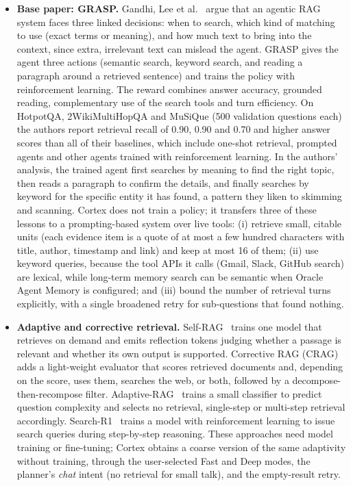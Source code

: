 \begin{itemize}
\item \textbf{Base paper: GRASP.} Gandhi, Lee et al.~\cite{grasp2026} argue that an agentic RAG system faces three linked decisions: when to search, which kind of matching to use (exact terms or meaning), and how much text to bring into the context, since extra, irrelevant text can mislead the agent. GRASP gives the agent three actions (semantic search, keyword search, and reading a paragraph around a retrieved sentence) and trains the policy with reinforcement learning. The reward combines answer accuracy, grounded reading, complementary use of the search tools and turn efficiency. On HotpotQA, 2WikiMultiHopQA and MuSiQue (500 validation questions each) the authors report retrieval recall of 0.90, 0.90 and 0.70 and higher answer scores than all of their baselines, which include one-shot retrieval, prompted agents and other agents trained with reinforcement learning. In the authors' analysis, the trained agent first searches by meaning to find the right topic, then reads a paragraph to confirm the details, and finally searches by keyword for the specific entity it has found, a pattern they liken to skimming and scanning. Cortex does not train a policy; it transfers three of these lessons to a prompting-based system over live tools: (i) retrieve small, citable units (each evidence item is a quote of at most a few hundred characters with title, author, timestamp and link) and keep at most 16 of them; (ii) use keyword queries, because the tool APIs it calls (Gmail, Slack, GitHub search) are lexical, while long-term memory search can be semantic when Oracle Agent Memory is configured; and (iii) bound the number of retrieval turns explicitly, with a single broadened retry for sub-questions that found nothing.

\item \textbf{Adaptive and corrective retrieval.} Self-RAG~\cite{asai2024selfrag} trains one model that retrieves on demand and emits reflection tokens judging whether a passage is relevant and whether its own output is supported. Corrective RAG (CRAG)~\cite{yan2024crag} adds a light-weight evaluator that scores retrieved documents and, depending on the score, uses them, searches the web, or both, followed by a decompose-then-recompose filter. Adaptive-RAG~\cite{jeong2024adaptiverag} trains a small classifier to predict question complexity and selects no retrieval, single-step or multi-step retrieval accordingly. Search-R1~\cite{jin2025searchr1} trains a model with reinforcement learning to issue search queries during step-by-step reasoning. These approaches need model training or fine-tuning; Cortex obtains a coarse version of the same adaptivity without training, through the user-selected Fast and Deep modes, the planner's \emph{chat} intent (no retrieval for small talk), and the empty-result retry.


\end{itemize}

